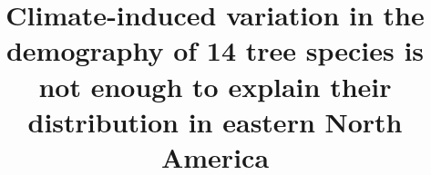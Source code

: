 \documentclass[letterpaper, 12pt]{article}
\title{Climate-induced variation in the demography of 14 tree species is not enough to explain their distribution in eastern North America}
\author{}
\theoremstyle{theo}
\begin{document}
\maketitle

\begin{onehalfspace}






% 

\end{onehalfspace}

\begin{refcontext}[sorting=nyt]
\printbibliography
\end{refcontext}






% 
% 
% 
% 
% 
% 
% 
\end{document}
